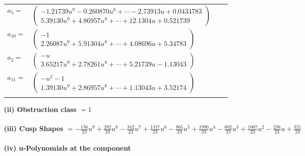 \documentclass[1p]{elsarticle_modified}
\theoremstyle{definition}
\begin{document}
\begin{tabular}{m{7pt} m{180pt} m{7pt} m{180pt} }
\flushright $a_{5}=$&$\begin{pmatrix}-1.21739 u^{9}-0.260870 u^{8}+\cdots-2.73913 u+0.0434783\\5.39130 u^{9}+4.86957 u^{8}+\cdots+12.1304 u+0.521739\end{pmatrix}$ \\
\flushright $a_{10}=$&$\begin{pmatrix}-1\\2.26087 u^{9}+5.91304 u^{8}+\cdots+4.08696 u+5.34783\end{pmatrix}$ \\
\flushright $a_{2}=$&$\begin{pmatrix}- u\\3.65217 u^{9}+2.78261 u^{8}+\cdots+5.21739 u-1.13043\end{pmatrix}$ \\
\flushright $a_{11}=$&$\begin{pmatrix}- u^2-1\\1.39130 u^{9}+2.86957 u^{8}+\cdots+1.13043 u+3.52174\end{pmatrix}$\\&\end{tabular}
\flushleft \textbf{(ii) Obstruction class $= 1$}\\~\\
\flushleft \textbf{(iii) Cusp Shapes $= -\frac{156}{23} u^9+\frac{282}{23} u^8-\frac{342}{23} u^7+\frac{1317}{23} u^6-\frac{865}{23} u^5+\frac{1990}{23} u^4-\frac{602}{23} u^3+\frac{1067}{23} u^2-\frac{236}{23} u+\frac{321}{23}$}\\~\\
\newpage\renewcommand{\arraystretch}{1}
\flushleft \textbf{(iv) u-Polynomials at the component}\newline \\
\end{document}
